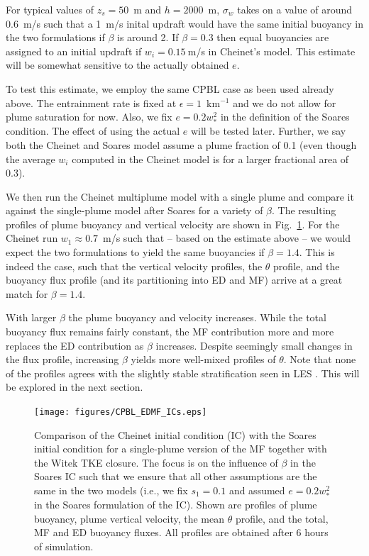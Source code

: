 \documentclass[dvipdfmx,a4paper,10pt]{article}
\begin{document}
{\color{blue} For typical values of $z_s=50$~m and $h=2000$~m, $\sigma_w$ takes on a value of around 0.6~m/s such that a 1~m/s inital updraft would have the same initial buoyancy in the two formulations if $\beta$ is around 2. If $\beta=0.3$ then equal buoyancies are assigned to an initial updraft if $w_i=0.15~$m/s in Cheinet's model. This estimate will be somewhat sensitive to the actually obtained $e$.}

To test this estimate, we employ the same CPBL case \citep{nieuwstadt93,witek11} as been used already above. The entrainment rate is fixed at $\epsilon=1$~km$^{-1}$ and we do not allow for plume saturation for now. Also, we fix $e=0.2w_*^2$ in the definition of the Soares condition. The effect of using the actual $e$ will be tested later. Further, we say both the Cheinet and Soares model assume a plume fraction of 0.1 (even though the average $w_i$ computed in the Cheinet model is for a larger fractional area of 0.3).

We then run the Cheinet multiplume model with a single plume and compare it against the single-plume model after Soares for a variety of $\beta$. The resulting profiles of plume buoyancy and vertical velocity are shown in Fig.~\ref{fig:ICs}. For the Cheinet run $w_1\approx0.7$~m/s such that -- based on the estimate above -- we would expect the two formulations to yield the same buoyancies if $\beta=1.4$. This is indeed the case, such that the vertical velocity profiles, the $\theta$ profile, and the buoyancy flux profile (and its partitioning into ED and MF) arrive at a great match for $\beta=1.4$. 

With larger $\beta$ the plume buoyancy and velocity increases. While the total buoyancy flux remains fairly constant, the MF contribution more and more replaces the ED contribution as $\beta$ increases. Despite seemingly small changes in the flux profile, increasing $\beta$ yields more well-mixed profiles of $\theta$. {\color{blue} Note that none of the profiles agrees with the slightly stable stratification seen in LES \citep{witek11}. This will be explored in the next section. }


\begin{figure}[bthp]
\centering
 \texttt{[image: figures/CPBL\_EDMF\_ICs.eps]}
\caption{Comparison of the Cheinet initial condition (IC) with the Soares initial condition for a single-plume version of the MF together with the Witek TKE closure. The focus is on the influence of $\beta$ in the Soares IC such that we ensure that all other assumptions are the same in the two models (i.e., we fix $s_1=0.1$ and assumed $e=0.2w_*^2$ in the Soares formulation of the IC). Shown are profiles of plume buoyancy, plume vertical velocity, the mean $\theta$ profile, and the total, MF and ED buoyancy fluxes. All profiles are obtained after 6 hours of simulation.} \label{fig:ICs}
\end{figure}
\end{document}
